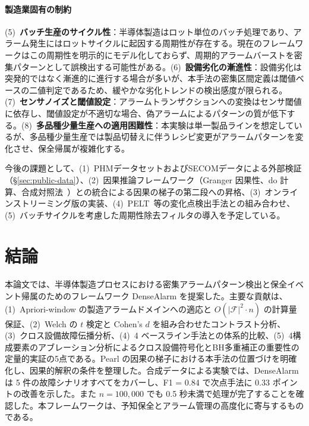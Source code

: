 \documentclass[11pt]{article}
\begin{document}
\paragraph{製造業固有の制約}
(5)~\textbf{バッチ生産のサイクル性}：半導体製造はロット単位のバッチ処理であり、アラーム発生にはロットサイクルに起因する周期性が存在する。現在のフレームワークはこの周期性を明示的にモデル化しておらず、周期的アラームバーストを密集パターンとして誤検出する可能性がある。(6)~\textbf{設備劣化の漸進性}：設備劣化は突発的ではなく漸進的に進行する場合が多いが、本手法の密集区間定義は閾値ベースの二値判定であるため、緩やかな劣化トレンドの検出感度が限られる。(7)~\textbf{センサノイズと閾値設定}：アラームトランザクションへの変換はセンサ閾値に依存し、閾値設定が不適切な場合、偽アラームによるパターンの質が低下する。(8)~\textbf{多品種少量生産への適用困難性}：本実験は単一製品ラインを想定しているが、多品種少量生産では製品切替えに伴うレシピ変更がアラームパターンを変化させ、保全帰属が複雑化する。

今後の課題として、(1)~PHMデータセットおよびSECOMデータによる外部検証（\S\ref{sec:public-data}）、(2)~因果推論フレームワーク（Granger 因果性、do 計算、合成対照法~\citep{abadie2010synth}）との統合による因果の梯子の第二段への昇格、(3)~オンラインストリーミング版の実装、(4)~PELT~\citep{killick2012pelt}等の変化点検出手法との組み合わせ、(5)~バッチサイクルを考慮した周期性除去フィルタの導入を予定している。

\section{結論}\label{sec:conclusion}

本論文では、半導体製造プロセスにおける密集アラームパターン検出と保全イベント帰属のためのフレームワーク DenseAlarm を提案した。主要な貢献は、(1)~Apriori-window の製造アラームドメインへの適応と $O(|\mathcal{F}|^2 \cdot n)$ の計算量保証、(2)~Welch の $t$ 検定と Cohen's $d$ を組み合わせたコントラスト分析、(3)~クロス設備故障伝播分析、(4)~4 ベースライン手法との体系的比較、(5)~4構成要素のアブレーション分析によるクロス設備符号化とBH多重補正の重要性の定量的実証の5点である。Pearl の因果の梯子における本手法の位置づけを明確化し、因果的解釈の条件を整理した。合成データによる実験では、DenseAlarm は 5 件の故障シナリオすべてをカバーし、F1 = 0.84 で次点手法に 0.33 ポイントの改善を示した。また $n=100{,}000$ でも 0.5 秒未満で処理が完了することを確認した。本フレームワークは、予知保全とアラーム管理の高度化に寄与するものである。



\end{document}
